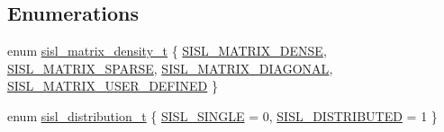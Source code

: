 \subsection*{Enumerations}
\begin{DoxyCompactItemize}
\item 
enum \mbox{\hyperlink{group__matrix_gae50d4f05ed96de495bdd326c201c28ff}{sisl\+\_\+matrix\+\_\+density\+\_\+t}} \{ \mbox{\hyperlink{group__matrix_ggae50d4f05ed96de495bdd326c201c28ffaae029c486fdd12732f4655d184b0ed57}{S\+I\+S\+L\+\_\+\+M\+A\+T\+R\+I\+X\+\_\+\+D\+E\+N\+SE}}, 
\mbox{\hyperlink{group__matrix_ggae50d4f05ed96de495bdd326c201c28ffa0c0ef4a4a8df53f64b9237c1fb4acc75}{S\+I\+S\+L\+\_\+\+M\+A\+T\+R\+I\+X\+\_\+\+S\+P\+A\+R\+SE}}, 
\mbox{\hyperlink{group__matrix_ggae50d4f05ed96de495bdd326c201c28ffab0e90537b27c329cce3231200cda3e5f}{S\+I\+S\+L\+\_\+\+M\+A\+T\+R\+I\+X\+\_\+\+D\+I\+A\+G\+O\+N\+AL}}, 
\mbox{\hyperlink{group__matrix_ggae50d4f05ed96de495bdd326c201c28ffa64a3cff2469cac8f45575896e548611c}{S\+I\+S\+L\+\_\+\+M\+A\+T\+R\+I\+X\+\_\+\+U\+S\+E\+R\+\_\+\+D\+E\+F\+I\+N\+ED}}
 \}
\item 
enum \mbox{\hyperlink{group__matrix_ga03fd8bd724705cd998bb37b51393c0d4}{sisl\+\_\+distribution\+\_\+t}} \{ \mbox{\hyperlink{group__matrix_gga03fd8bd724705cd998bb37b51393c0d4a2c7ad8cda72338a63fc48b67ba475e91}{S\+I\+S\+L\+\_\+\+S\+I\+N\+G\+LE}} = 0, 
\mbox{\hyperlink{group__matrix_gga03fd8bd724705cd998bb37b51393c0d4a2719aa856008ad9e5b049874411dc69d}{S\+I\+S\+L\+\_\+\+D\+I\+S\+T\+R\+I\+B\+U\+T\+ED}} = 1
 \}
\end{DoxyCompactItemize}
